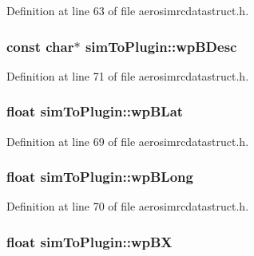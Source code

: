 \-Definition at line 63 of file aerosimrcdatastruct.\-h.

\hypertarget{group___aero_sim_r_c_ga847521c9c396ca010d434dde9d9c33ee}{
\subsubsection[{wp\-B\-Desc}]{\setlength{\rightskip}{0pt plus 5cm}const char$\ast$ {\bf sim\-To\-Plugin\-::wp\-B\-Desc}}}\label{group___aero_sim_r_c_ga847521c9c396ca010d434dde9d9c33ee}


\-Definition at line 71 of file aerosimrcdatastruct.\-h.

\hypertarget{group___aero_sim_r_c_gad362dcc92c44981f1062410b4d0105d8}{
\subsubsection[{wp\-B\-Lat}]{\setlength{\rightskip}{0pt plus 5cm}float {\bf sim\-To\-Plugin\-::wp\-B\-Lat}}}\label{group___aero_sim_r_c_gad362dcc92c44981f1062410b4d0105d8}


\-Definition at line 69 of file aerosimrcdatastruct.\-h.

\hypertarget{group___aero_sim_r_c_ga00083d7085ddb6c0cd1b432f5338d7d5}{
\subsubsection[{wp\-B\-Long}]{\setlength{\rightskip}{0pt plus 5cm}float {\bf sim\-To\-Plugin\-::wp\-B\-Long}}}\label{group___aero_sim_r_c_ga00083d7085ddb6c0cd1b432f5338d7d5}


\-Definition at line 70 of file aerosimrcdatastruct.\-h.

\hypertarget{group___aero_sim_r_c_gaf7735ebc4b357abc63f8b409da005e65}{
\subsubsection[{wp\-B\-X}]{\setlength{\rightskip}{0pt plus 5cm}float {\bf sim\-To\-Plugin\-::wp\-B\-X}}}\label{group___aero_sim_r_c_gaf7735ebc4b357abc63f8b409da005e65}


